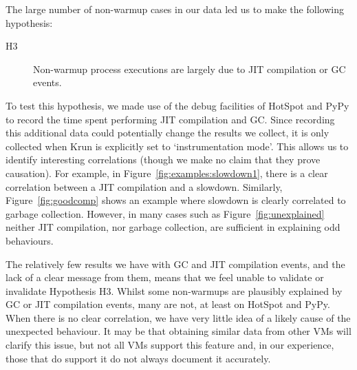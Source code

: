 \documentclass[acmsmall]{acmart}\settopmatter{printfolios=true}
\newcommand{\krun}{Krun\xspace}
\newcommand{\hypthree}{H3\xspace}
\begin{document}
The large number of non-warmup cases in our data led us to make the following hypothesis:
\begin{description}
  \item[\hypthree] Non-warmup process executions are largely due to JIT compilation or GC events.
\end{description}
To test this hypothesis, we made use of the debug facilities of HotSpot and PyPy to
record the time spent performing JIT compilation and GC. Since
recording this additional data could potentially change the results we collect,
it is only collected when \krun is explicitly set to `instrumentation mode'.
This allows us to identify interesting correlations (though we make no claim
that they prove causation). For
example, in Figure~\ref{fig:examples:slowdown1}, there is a clear correlation
between a JIT compilation and a slowdown. Similarly, Figure~\ref{fig:goodcomp} shows an
example where slowdown is clearly correlated to garbage collection.
However, in many cases such as Figure~\ref{fig:unexplained} neither JIT
compilation, nor garbage collection, are sufficient in explaining odd
behaviours.

The relatively few results we have with GC and JIT compilation events, and the lack of a clear
message from them, means that we feel unable to validate or invalidate
Hypothesis \hypthree. Whilst some non-warmups are plausibly explained by GC or JIT compilation events, many are not, at
least on HotSpot and PyPy. When there is no clear correlation, we have very little idea of
a likely cause of the unexpected behaviour. It may be that obtaining similar data
from other VMs will clarify this issue, but not all VMs support this
feature and, in our experience, those that do support it do not always
document it accurately.
\end{document}
